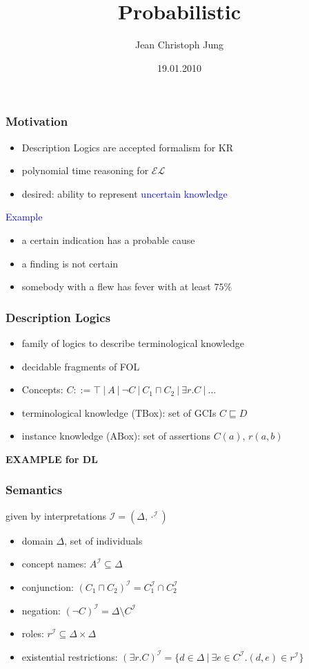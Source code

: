 \documentclass[draft]{beamer}
\title{Probabilistic \el}
\author{Jean Christoph Jung}
\date{19.01.2010}
\institute[TdKI Bremen]{AG Theoretische Grundlagen der K\"unstlichen Intelligenz \\ Universit\"at Bremen}
\newcommand{\el}{\ensuremath{\mathcal{EL}}\xspace}
\newcommand{\I}{\ensuremath{\mathcal{I}}\xspace}
\renewcommand{\emph}[1]{\textcolor{blue}{#1}}
\begin{document}
\begin{frame}
	\titlepage
\end{frame}


\begin{frame}
  \frametitle{Motivation}
  \begin{itemize}
    \item Description Logics are accepted formalism for KR
    \item polynomial time reasoning for \el
    \item desired: ability to represent \emph{uncertain knowledge}
  \end{itemize}

  \emph{Example} 
  \begin{itemize}
    \item a certain indication has a probable cause
    \item a finding is not certain
    \item somebody with a flew has fever with at least $75\%$
  \end{itemize}
\end{frame}


\begin{frame}
	\frametitle{Description Logics}
	\begin{itemize}
		\item family of logics to describe terminological knowledge
		\item decidable fragments of FOL
		\item 
			Concepts:	$C: :=\top~|~A~|~\neg C~|~C_1\sqcap C_2~|~\exists r.C~|~\ldots$
		\item 
			terminological knowledge (TBox): set of GCIs $C\sqsubseteq D$
		\item
			instance knowledge (ABox): set of assertions $C(a)$, $r(a,b)$
	\end{itemize}
	\textbf{EXAMPLE for DL}
\end{frame}


\begin{frame}
	\frametitle{Semantics}
	given by interpretations $\I=(\Delta,\cdot^{\I})$
	\begin{itemize}
		\item domain $\Delta$, set of individuals
		\item concept names: $A^{\I}\subseteq\Delta$
		\item conjunction: $(C_1\sqcap C_2)^{\I}=C_1^{\I}\cap C_2^{\I}$
		\item negation: $(\neg C)^{\I}=\Delta\setminus C^{\I}$
		\item roles: $r^{\I}\subseteq\Delta\times\Delta$
		\item existential restrictions: $(\exists r.C)^{\I}=\{d\in\Delta~|~\exists e\in C^{\I}.(d,e)\in r^{\I}\}$
	\end{itemize}
\end{frame}
\end{document}
